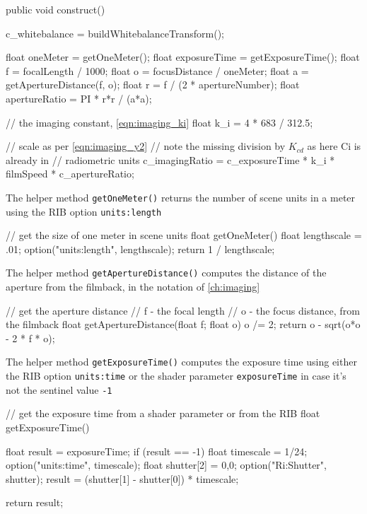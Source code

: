 \begin{rslcode}
public void construct()
{
    c_whitebalance = buildWhitebalanceTransform();

    float oneMeter = getOneMeter();
    float exposureTime = getExposureTime();
    float f = focalLength / 1000;
    float o = focusDistance / oneMeter;
    float a = getApertureDistance(f, o);
    float r = f / (2 * apertureNumber);
    float apertureRatio = PI * r*r / (a*a);

    // the imaging constant, \cref{eqn:imaging_ki}
    float k_i = 4 * 683 / 312.5;

    // scale as per \cref{eqn:imaging_y2}
    // note the missing division by $K_{cd}$ as here Ci is already in
    // radiometric units
    c_imagingRatio = c_exposureTime * k_i * filmSpeed * c_apertureRatio;
}
\end{rslcode}

The helper method \Verb|getOneMeter()| returns the number of scene units in a
meter using the \gls{RIB} option \Verb|units:length|

\begin{rslcode}
// get the size of one meter in scene units
float getOneMeter()
{
    float lengthscale = .01;
    option("units:length", lengthscale);
    return 1 / lengthscale;
}
\end{rslcode}


The helper method \Verb|getApertureDistance()| computes the distance of the
aperture from the filmback, in the notation of \cref{ch:imaging}

\begin{rslcode}
// get the aperture distance
// f - the focal length
// o - the focus distance, from the filmback
float getApertureDistance(float f; float o)
{
    o /= 2;
    return o - sqrt(o*o - 2 * f * o);
}
\end{rslcode}


The helper method \Verb|getExposureTime()| computes the exposure time using
either the \gls{RIB} option \Verb|units:time| or the shader parameter
\Verb|exposureTime| in case it's not the sentinel value \Verb|-1|

\begin{rslcode}
// get the exposure time from a shader parameter or from the RIB
float getExposureTime()
{
    float result = exposureTime;
    if (result == -1)
    {
        float timescale = 1/24;
        option("units:time", timescale);
        float shutter[2] = {0,0};
        option("Ri:Shutter", shutter);
        result = (shutter[1] - shutter[0]) * timescale;
    }

    return result;
}
\end{rslcode}


